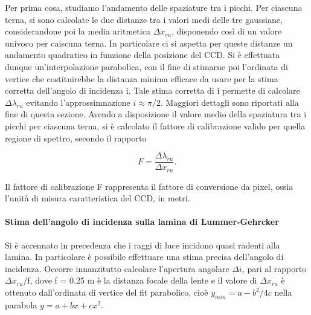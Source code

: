 \documentclass{article}
\begin{document}
	Per prima cosa, studiamo l'andamento delle spaziature tra i picchi. 
	Per ciascuna terna, si sono calcolate le due distanze tra i valori medi
	delle tre gaussiane, considerandone poi la media aritmetica $\Delta x_{ru}$,
	disponendo così di un valore univoco per caiscuna terna.
	In particolare ci si aspetta per queste distanze un andamento quadratico 
	in funzione della posizione del CCD. Si è effettuata dunque un'interpolazione
	parabolica, con il fine di stimarne poi l'ordinata di vertice che 
	costituirebbe la distanza minima efficace da usare per la stima
	corretta dell'angolo di incidenza i. Tale stima corretta di i
	permette di calcolare $\Delta\lambda_{ru}$ evitando l'approssimnazione $i \approx \pi$/2. 
	Maggiori dettagli sono riportati alla fine di questa sezione.
	Avendo a disposizione il valore medio della spaziatura tra i picchi per ciascuna
	terna, si è calcolato il fattore di calibrazione valido per quella regione
	di spettro, secondo il rapporto

	\begin{equation}
		F = \frac{\Delta\lambda_{ru}}{\Delta x_{ru}}.
	\end{equation}

	Il fattore di calibrazione F rappresenta il fattore di conversione da pixel, 
	ossia l'unità di misura caratteristica del CCD, in metri.




	\paragraph{Stima dell'angolo di incidenza sulla lamina di Lummer-Gehrcker}
	Si è accennato in precedenza che i raggi di luce incidono quasi radenti
	alla lamina. In particolare è possibile effettuare una stima precisa dell'angolo
	di incidenza. Occorre innanzitutto calcolare l'apertura angolare
	$\Delta i$, pari al rapporto $\Delta x_{ru}$/f, dove f = 0.25 m è la distanza
	focale della lente e il valore di $\Delta x_{ru}$ è ottenuto dall'ordinata 
	di vertice del fit parabolico, cioè $y_{min} = a - b^2 / 4c$ nella 
	parabola $y = a +bx + cx^2$.
\end{document}
